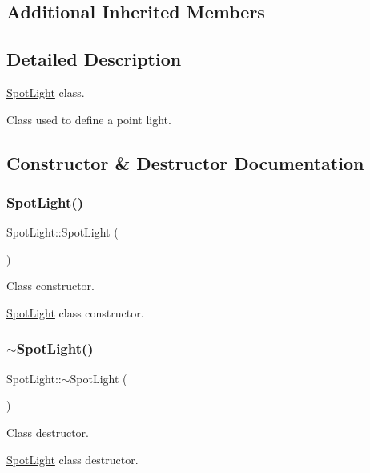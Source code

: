 \subsection*{Additional Inherited Members}


\subsection{Detailed Description}
\hyperlink{class_spot_light}{Spot\+Light} class. 

Class used to define a point light. 

\subsection{Constructor \& Destructor Documentation}
\mbox{\label{class_spot_light_ae4045cd7c8c6d18af39b57c9cf6f9ce6}} 
\subsubsection{\texorpdfstring{Spot\+Light()}{SpotLight()}}
{\footnotesize\ttfamily Spot\+Light\+::\+Spot\+Light (\begin{DoxyParamCaption}{ }\end{DoxyParamCaption})}



Class constructor. 

\hyperlink{class_spot_light}{Spot\+Light} class constructor. \mbox{\label{class_spot_light_aa16b741d73aa198c203ce40a066a115c}} 
\subsubsection{\texorpdfstring{$\sim$\+Spot\+Light()}{~SpotLight()}}
{\footnotesize\ttfamily Spot\+Light\+::$\sim$\+Spot\+Light (\begin{DoxyParamCaption}{ }\end{DoxyParamCaption})}



Class destructor. 

\hyperlink{class_spot_light}{Spot\+Light} class destructor. 

